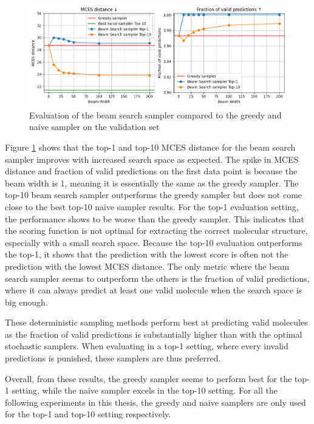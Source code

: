 \begin{figure}[h]
    \centering
    \includegraphics[width=1.0\textwidth]{figures/results/samplers/beam_search.png}
    \caption{Evaluation of the beam search sampler compared to the greedy and naive sampler on the validation set}
    \label{fig:beam-search}
\end{figure}

Figure \ref{fig:beam-search} shows that the top-1 and top-10 MCES distance for the beam search sampler improves with increased search space as expected.
The spike in MCES distance and fraction of valid predictions on the first data point is because the beam width is 1, meaning it is essentially the same as the greedy sampler.
The top-10 beam search sampler outperforms the greedy sampler but does not come close to the best top-10 naive sampler results. 
For the top-1 evaluation setting, the performance shows to be worse than the greedy sampler.
This indicates that the scoring function is not optimal for extracting the correct molecular structure, especially with a small search space.
Because the top-10 evaluation outperforms the top-1, it shows that the prediction with the lowest score is often not the prediction with the lowest MCES distance.
The only metric where the beam search sampler seems to outperform the others is the fraction of valid predictions, where it can always predict at least one valid molecule when the search space is big enough.

These deterministic sampling methods perform best at predicting valid molecules as the fraction of valid predictions is substantially higher than with the optimal stochastic samplers.
When evaluating in a top-1 setting, where every invalid predictions is punished, these samplers are thus preferred.

Overall, from these results, the greedy sampler seems to perform best for the top-1 setting, while the naive sampler excels in the top-10 setting.
For all the following experiments in this thesis, the greedy and naive samplers are only used for the top-1 and top-10 setting respectively.


